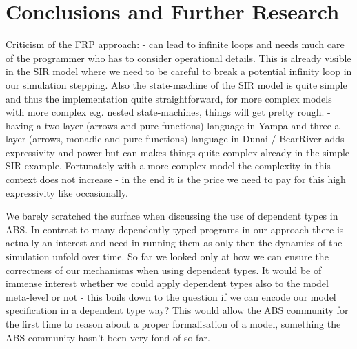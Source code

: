 \section{Conclusions and Further Research}
Criticism of the FRP approach:
- can lead to infinite loops and needs much care of the programmer who has to consider operational details. This is already visible in the SIR model where we need to be careful to break a potential infinity loop in our simulation stepping. Also the state-machine of the SIR model is quite simple and thus the implementation quite straightforward, for more complex models with more complex e.g. nested state-machines, things will get pretty rough.
- having a two layer (arrows and pure functions) language in Yampa \cite{jeffrey_causality_2013} and three a layer (arrows, monadic and pure functions) language in Dunai / BearRiver adds expressivity and power but can makes things quite complex already in the simple SIR example. Fortunately with a more complex model the complexity in this context does not increase - in the end it is the price we need to pay for this high expressivity like occasionally.

We barely scratched the surface when discussing the use of dependent types in ABS. In contrast to many dependently typed programs in our approach there is actually an interest and need in running them as only then the dynamics of the simulation unfold over time. So far we looked only at how we can ensure the correctness of our mechanisms when using dependent types. It would be of immense interest whether we could apply dependent types also to the model meta-level or not - this boils down to the question if we can encode our model specification in a dependent type way? This would allow the ABS community for the first time to reason about a proper formalisation of a model, something the ABS community hasn't been very fond of so far.